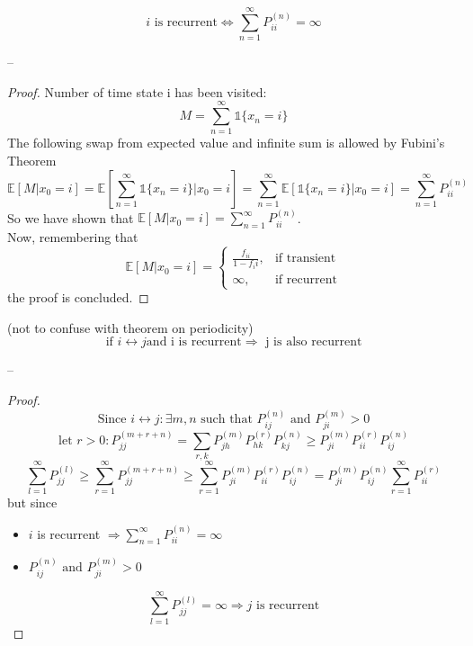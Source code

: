 \begin{theorem}
$$i  \mbox{ is recurrent} \iff \sum_{n=1}^\infty P_{ii}^{(n)} = \infty$$
\end{theorem}
--
\begin{proof}
Number of time state i has been visited: $$M = \sum_{n=1}^\infty \mathds{1}\{x_n =i\} $$
The following swap from expected value and infinite sum is allowed by Fubini's Theorem$$ \mathbb{E}[M | x_0 = i] = \mathbb{E}[\sum_{n=1}^\infty \mathds{1}\{x_n = i\} | x_0 = i] = \sum_{n=1}^\infty \mathbb{E}[\mathds{1}\{ x_n = i\} | x_0 = i] = \sum_{n=1}^\infty P_{ii}^{(n)} $$
So we have shown that $\mathbb{E}[M | x_0=i] = \sum_{n=1}^\infty P_{ii}^{(n)}$.\\
Now, remembering that$$ \mathbb{E}[M | x_0 = i] = \begin{cases}
\frac{f_{ii}}{1-f_ii}, & \mbox{if transient} \\
\infty, & \mbox{if recurrent}
\end{cases}$$
the proof is concluded.
\end{proof}

\begin{theorem}
(not to confuse with theorem on periodicity)
$$\mbox{if } i\leftrightarrow j \mbox{and i is recurrent} \Rightarrow \mbox{ j is also recurrent}$$
\end{theorem}
--
\begin{proof}
$$\mbox{Since } i\leftrightarrow j : \exists m,n \mbox{ such that } P_{ij}^{(n)} \mbox{ and } P_{ji}^{(m)} > 0$$
$$\mbox{let } r>0 : P_{jj}^{(m+r+n)} = \sum_{r, k} P_{jh}^{(m)} P_{hk}^{(r)} P_{kj}^{(n)} \geq P_{ji}^{(m)}  P_{ii}^{(r)}  P_{ij}^{(n)}$$
$$\sum_{l=1}^\infty P_{jj}^{(l)} \geq \sum_{r=1}^\infty P_{jj}^{(m+r+n)} \geq \sum_{r=1}^\infty P_{ji}^{(m)}  P_{ii}^{(r)}  P_{ij}^{(n)} = P_{ji}^{(m)} P_{ij}^{(n)} \sum_{r=1}^\infty P_{ii}^{(r)}$$
but since \begin{itemize}
\item$i$ is recurrent $\Rightarrow \sum_{n=1}^\infty P_{ii}^{(n)} = \infty$
\item $P_{ij}^{(n)} \mbox{ and } P_{ji}^{(m)} > 0$
\end{itemize}
$$\sum_{l=1}^\infty P_{jj}^{(l)} = \infty \Rightarrow j \mbox{ is recurrent}$$

\end{proof}



